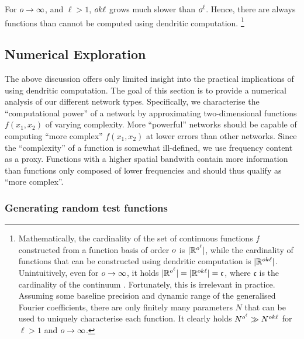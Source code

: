 For $o \to \infty$, and $\ell > 1$, $o k \ell$ grows much slower than $o^\ell$.
Hence, there are always functions than cannot be computed using dendritic computation.%
\footnote{Mathematically, the cardinality of the set of continuous functions $f$ constructed from a function basis of order $o$ is $|\mathbb{R}^{o^\ell}|$, while the cardinality of functions that can be constructed using dendritic computation is $|\mathbb{R}^{o k \ell}|$.
Unintuitively, even for $o \to \infty$, it holds $|\mathbb{R}^{o^\ell}| = |\mathbb{R}^{o k\ell}| = \mathfrak{c}$, where $\mathfrak{c}$ is the cardinality of the continuum \citep[e.g.,][Chapter~4]{jech2003set}.
Fortunately, this is irrelevant in practice.
Assuming some baseline precision and dynamic range of the generalised Fourier coefficients, there are only finitely many parameters $N$ that can be used to uniquely characterise each function. It clearly holds $N^{o^\ell} \gg N^{o k \ell}$ for $\ell > 1$ and $o \to \infty$.}

\subsection{Numerical Exploration}
\label{sec:dendritic_computation_theory_numerical}

The above discussion offers only limited insight into the practical implications of using dendritic computation.
The goal of this section is to provide a numerical analysis of our different network types.
Specifically, we characterise the \enquote{computational power} of a network by approximating two-dimensional functions $f(x_1, x_2)$ of varying complexity.
More \enquote{powerful} networks should be capable of computing \enquote{more complex} $f(x_1, x_2)$ at lower errors than other networks.
Since the \enquote{complexity} of a function is somewhat ill-defined, we use frequency content as a proxy.
Functions with a higher spatial bandwith contain more information \citep[cf.][]{shannon1949communication} than functions only composed of lower frequencies and should thus qualify as \enquote{more complex}.

\subsubsection{Generating random test functions}

